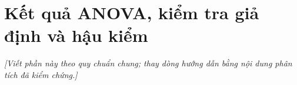 \section{Kết quả ANOVA, kiểm tra giả định và hậu kiểm}
\noindent\textit{[Viết phần này theo quy chuẩn chung; thay dòng hướng dẫn bằng nội dung phân tích đã kiểm chứng.]}


